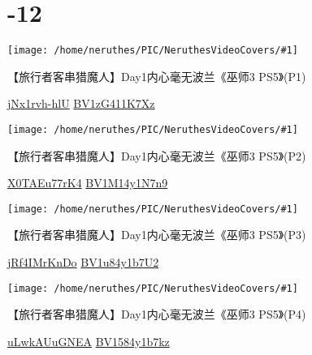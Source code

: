 


\newcommand{\videoitem}[4]{
    \parbox[b][29mm][b]{\linewidth}{%
        \texttt{[image: /home/neruthes/PIC/NeruthesVideoCovers/\#1]}%
        \hfill%
        \parbox[b][29mm][b]{27em}{
            \leavevmode\vskip 2pt
            \raggedright
            \large#2\par\vfill
            \footnotesize\ttfamily
            \textcolor{gray}{%
                \href{https://www.youtube.com/watch?v=#3}{#3}\hfill%
                \href{https://www.bilibili.com/video/#4}{#4}%
            }\par\vskip 2pt%
        }%
    }%
    \par
    \vskip 11pt
}




\section*{-12}

\videoitem{wit3ps5/.tbcache/wit3ps5-day001-1}{【旅行者客串猎魔人】Day1内心毫无波兰《巫师3 PS5》(P1)}{jNx1rvh-hlU}{BV1zG411K7Xz}
\videoitem{wit3ps5/.tbcache/wit3ps5-day001-2}{【旅行者客串猎魔人】Day1内心毫无波兰《巫师3 PS5》(P2)}{X0TAEu77rK4}{BV1M14y1N7n9}
\videoitem{wit3ps5/.tbcache/wit3ps5-day001-3}{【旅行者客串猎魔人】Day1内心毫无波兰《巫师3 PS5》(P3)}{jRf4IMrKnDo}{BV1u84y1b7U2}
\videoitem{wit3ps5/.tbcache/wit3ps5-day001-4}{【旅行者客串猎魔人】Day1内心毫无波兰《巫师3 PS5》(P4)}{uLwkAUuGNEA}{BV1584y1b7kz}


